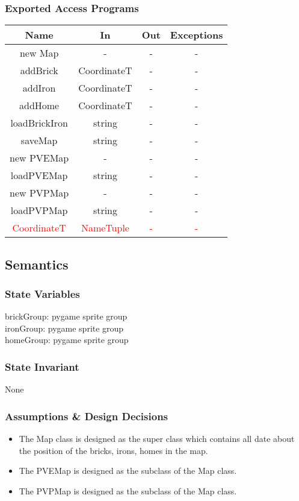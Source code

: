 \documentclass[12pt, titlepage]{article}
\begin{document}
		\subsubsection{Exported Access Programs}
				\begin{tabular}[pos]{|c|c|c|c|}
					
					\hline
					\textbf{Name}& \textbf{In} & \textbf{Out} & \textbf{Exceptions} \\ \hline
					new Map & - & - & -\\ \hline
					addBrick & CoordinateT & - & -\\ \hline
					addIron & CoordinateT & - & -\\ \hline
					addHome & CoordinateT & - & -\\ \hline
					loadBrickIron & string & - & -\\ \hline
					saveMap & string & - & -\\ \hline
					new PVEMap & - & - & -\\ \hline
					loadPVEMap & string & - & -\\ \hline
					new PVPMap & - & - & -\\ \hline
					loadPVPMap & string & - & -\\ \hline
					\textcolor{red}{CoordinateT} & \textcolor{red}{NameTuple} & \textcolor{red}{-} & \textcolor{red}{-}\\ \hline
					
				\end{tabular}
				
		
		\subsection{Semantics}
		\subsubsection{State Variables}
		brickGroup: pygame sprite group\\
		ironGroup: pygame sprite group\\
		homeGroup: pygame sprite group
		
		\subsubsection{State Invariant}
		None
		
		\subsubsection{Assumptions \& Design Decisions}
		\begin{itemize}
		\item The Map class is designed as the super class which contains all date about the position of the bricks, irons, homes in the map.
		
		\item The PVEMap is designed as the subclass of the Map class.
		
		\item The PVPMap is designed as the subclass of the Map class.
		\end{itemize}
		
\end{document}
